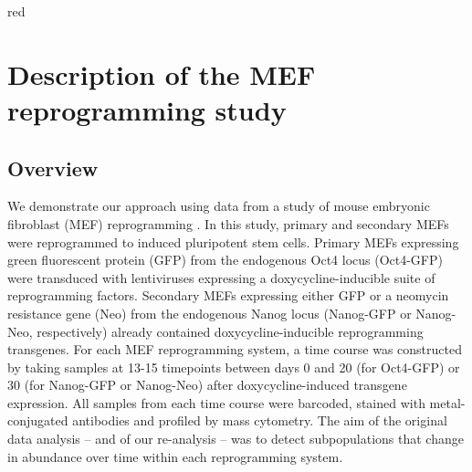 \documentclass{article}
\begin{document}
\begin{color}{red}
\section{Description of the MEF reprogramming study}

\subsection{Overview}
We demonstrate our approach using data from a study of mouse embryonic fibroblast (MEF) reprogramming \cite{zunder2015continuous}.
In this study, primary and secondary MEFs were reprogrammed to induced pluripotent stem cells.
Primary MEFs expressing green fluorescent protein (GFP) from the endogenous Oct4 locus (Oct4-GFP) were transduced with lentiviruses expressing a doxycycline-inducible suite of reprogramming factors.
Secondary MEFs expressing either GFP or a neomycin resistance gene (Neo) from the endogenous Nanog locus (Nanog-GFP or Nanog-Neo, respectively) already contained doxycycline-inducible reprogramming transgenes.
For each MEF reprogramming system, a time course was constructed by taking samples at 13-15 timepoints between days 0 and 20 (for Oct4-GFP) or 30 (for Nanog-GFP or Nanog-Neo) after doxycycline-induced transgene expression.
All samples from each time course were barcoded, stained with metal-conjugated antibodies and profiled by mass cytometry.
The aim of the original data analysis -- and of our re-analysis -- was to detect subpopulations that change in abundance over time within each reprogramming system.
\end{color}

\newcommand{\hi}{\textsuperscript{high}}
\newcommand{\lo}{\textsuperscript{low}}
\end{document}
